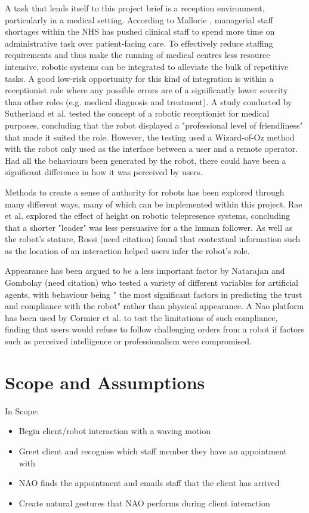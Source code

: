 \documentclass[conference]{IEEEtran}
\begin{document}
A task that lends itself to this project brief is a reception environment, particularly in a medical setting. According to 
Mallorie \cite{mallorie2024}, managerial staff shortages within the NHS has pushed clinical staff to spend more time on administrative task over 
patient-facing care. To effectively reduce staffing requirements and thus make the running of medical centres less resource intensive, robotic 
systems can be integrated to alleviate the bulk of repetitive tasks. A good low-risk opportunity for this kind of integration is within a 
receptionist role where any possible errors are of a significantly lower severity than other roles (e.g. medical diagnosis and treatment).
A study conducted by Sutherland et al. \cite{Sutherland2019} tested the concept of a robotic receptionist for medical purposes, concluding that the robot displayed a 
"professional level of friendliness" that made it suited the role. However, the testing used a Wizard-of-Oz method with the robot only 
used as the interface between a user and a remote operator. Had all the behaviours been generated by the robot, there could have been 
a significant difference in how it was perceived by users.

Methods to create a sense of authority for robots has been explored through many different ways, many of which can be implemented within 
this project. Rae et al. \cite{Rae2013} explored the effect of height on robotic telepresence systems, concluding that a shorter "leader" was less persuasive 
for a the human follower. As well as the robot's stature, Rossi (need citation) found that contextual information such as the location of an interaction 
helped users infer the robot’s role.

Appearance has been argued to be a less important factor by Natarajan and Gombolay (need citation) who tested a variety of different variables for artificial agents, with 
behaviour being " the most significant factors in predicting the trust and compliance with the robot" rather 
than physical appearance. A Nao platform has been used by Cormier et al. \cite{cormier2013} to test the limitations of such compliance, finding that users would 
refuse to follow challenging orders from a robot if factors such as perceived intelligence or professionalism were compromised.

\section{Scope and Assumptions} In Scope:
\begin{itemize}
        \item Begin client/robot interaction with a waving motion
        \item Greet client and recognise which staff member they have an appointment with
        \item NAO finds the appointment and emails staff that the client has arrived
        \item Create natural gestures that NAO performs during client interaction    
\end{itemize}
\end{document}
